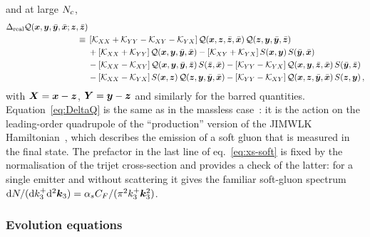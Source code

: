 and at large $N_c$,
\begin{align}
\Delta_{\rm real}\mathcal{Q}(\bm{x},\bm{y},\bar{\bm{y}},\bar{\bm{x}};\bm{z},\bar{\bm{z}})&
\nonumber\\
\equiv{}&\left[\mathcal{K}_{XX}+\mathcal{K}_{YY}-\mathcal{K}_{XY}-\mathcal{K}_{YX}\right]\mathcal{Q}(\bm{x},\bm{z},\bar{\bm{z}},\bar{\bm{x}})\,\mathcal{Q}(\bm{z},\bm{y},\bar{\bm{y}},\bar{\bm{z}})
\nonumber\\
&+\left[\mathcal{K}_{XX}+\mathcal{K}_{YY}\right]\mathcal{Q}(\bm{x},\bm{y},\bar{\bm{y}},\bar{\bm{x}})
-\left[\mathcal{K}_{XY}+\mathcal{K}_{YX}\right]S(\bm{x},\bm{y})\,S(\bar{\bm{y}},\bar{\bm{x}})
\nonumber\\
&-\left[\mathcal{K}_{XX}-\mathcal{K}_{XY}\right]\mathcal{Q}(\bm{x},\bm{y},\bar{\bm{y}},\bar{\bm{z}})\,S(\bar{\bm{z}},\bar{\bm{x}})
-\left[\mathcal{K}_{YY}-\mathcal{K}_{YX}\right]\mathcal{Q}(\bm{x},\bm{y},\bar{\bm{z}},\bar{\bm{x}})\,S(\bar{\bm{y}},\bar{\bm{z}})
\nonumber\\
&-\left[\mathcal{K}_{XX}-\mathcal{K}_{YX}\right]S(\bm{x},\bm{z})\,\mathcal{Q}(\bm{z},\bm{y},\bar{\bm{y}},\bar{\bm{x}})
-\left[\mathcal{K}_{YY}-\mathcal{K}_{XY}\right]\mathcal{Q}(\bm{x},\bm{z},\bar{\bm{y}},\bar{\bm{x}})\,S(\bm{z},\bm{y})\,,
\label{eq:DeltaQ}
\end{align}
with $\bm{X}=\bm{x}-\bm{z}$, $\bm{Y}=\bm{y}-\bm{z}$ and similarly for the barred quantities. Equation~\eqref{eq:DeltaQ} is the
same as in the massless case~\cite{Iancu:2022gpw}: it is the action on the leading-order quadrupole of
the ``production'' version of the JIMWLK
Hamiltonian~\cite{Kovner:2006ge,Kovner:2006wr,Iancu:2013uva}, which describes the emission of a soft
gluon that is measured in the final state. The prefactor in the last line of
eq.~\eqref{eq:xs-soft} is fixed by the normalisation of the trijet cross-section and provides a check
of the latter: for a single emitter and without scattering it gives the familiar soft-gluon spectrum
${\rm d} N/({\rm d} k_3^+{\rm d}^2\bm{k}_3)=\alpha_sC_F/(\pi^2k_3^+\bm{k}_3^2)$.

\subsubsection{Evolution equations}

